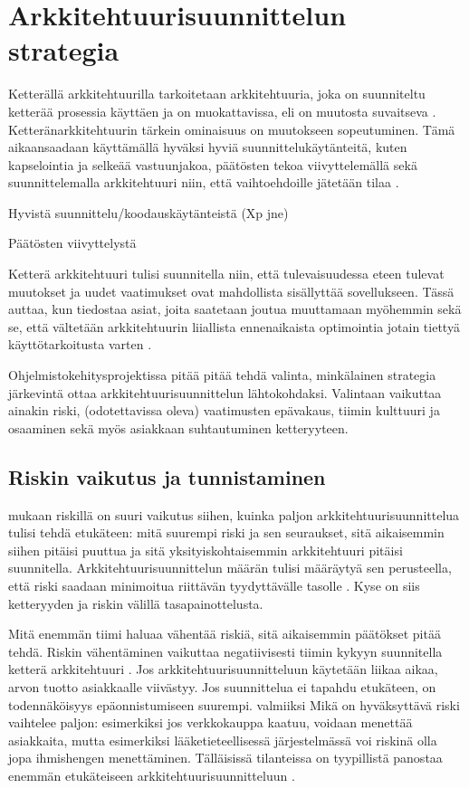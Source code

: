 \chapter{Arkkitehtuurisuunnittelun strategia}
Ketterällä arkkitehtuurilla tarkoitetaan arkkitehtuuria, joka on suunniteltu ketterää prosessia käyttäen ja on muokattavissa, eli on muutosta suvaitseva \citep{waterman_how_2015}. Ketteränarkkitehtuurin tärkein ominaisuus on muutokseen sopeutuminen. Tämä aikaansaadaan käyttämällä hyväksi hyviä suunnittelukäytänteitä, kuten kapselointia ja selkeää vastuunjakoa, päätösten tekoa viivyttelemällä sekä suunnittelemalla arkkitehtuuri niin, että vaihtoehdoille jätetään tilaa \citep{waterman_agility_2018_a}. 

Hyvistä suunnittelu/koodauskäytänteistä (Xp jne)

Päätösten viivyttelystä

Ketterä arkkitehtuuri tulisi suunnitella niin, että tulevaisuudessa eteen tulevat muutokset ja uudet vaatimukset ovat mahdollista sisällyttää sovellukseen. Tässä auttaa, kun tiedostaa asiat, joita saatetaan joutua muuttamaan myöhemmin sekä se, että vältetään arkkitehtuurin liiallista ennenaikaista optimointia jotain tiettyä käyttötarkoitusta varten 
\citep{waterman_agility_2018_a}.  

Ohjelmistokehitysprojektissa pitää pitää tehdä valinta, minkälainen strategia järkevintä ottaa arkkitehtuurisuunnittelun lähtokohdaksi. Valintaan vaikuttaa ainakin riski, (odotettavissa oleva) vaatimusten epävakaus, tiimin kulttuuri ja osaaminen sekä myös asiakkaan suhtautuminen ketteryyteen.

\section{Riskin vaikutus ja tunnistaminen}

\cite{waterman_agility_2018_b} mukaan riskillä on suuri vaikutus siihen, kuinka paljon arkkitehtuurisuunnittelua tulisi tehdä etukäteen: mitä suurempi riski ja sen seuraukset, sitä aikaisemmin siihen pitäisi puuttua ja sitä yksityiskohtaisemmin arkkitehtuuri pitäisi suunnitella. Arkkitehtuurisuunnittelun määrän tulisi määräytyä sen perusteella, että riski saadaan minimoitua riittävän tyydyttävälle tasolle \citep{fairbanks2010just}. Kyse on siis ketteryyden ja riskin välillä tasapainottelusta.

Mitä enemmän tiimi haluaa vähentää riskiä, sitä aikaisemmin päätökset pitää tehdä.
Riskin vähentäminen vaikuttaa negatiivisesti tiimin kykyyn suunnitella ketterä arkkitehtuuri \citep{waterman_agility_2018_b}. Jos arkkitehtuurisuunnitteluun käytetään liikaa aikaa, arvon tuotto asiakkaalle viivästyy. Jos suunnittelua ei tapahdu etukäteen, on todennäköisyys epäonnistumiseen suurempi.
valmiiksi
Mikä on hyväksyttävä riski vaihtelee paljon: esimerkiksi jos verkkokauppa kaatuu, voidaan menettää asiakkaita, mutta esimerkiksi lääketieteellisessä järjestelmässä voi riskinä olla jopa ihmishengen menettäminen. Tälläisissä tilanteissa on tyypillistä panostaa enemmän etukäteiseen arkkitehtuurisuunnitteluun \citep{waterman_agility_2018_b}. 

